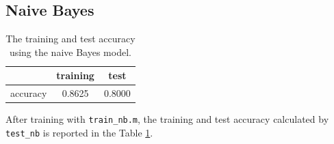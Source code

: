 \documentclass{article}
\begin{document}
\subsection{Naive Bayes}

\begin{table}[htbp]
\centering
\begin{tabular}{lcc}
\toprule
\ & training & test \\
\midrule
accuracy & 0.8625 & 0.8000\\
\bottomrule
\end{tabular}
\caption{The training and test accuracy using the naive Bayes model. 
\label{table:acc-nb}}
\end{table}

After training with \texttt{train\_nb.m}, the training and test accuracy calculated by \texttt{test\_nb} is reported in the Table \ref{table:acc-nb}.\\
\end{document}
